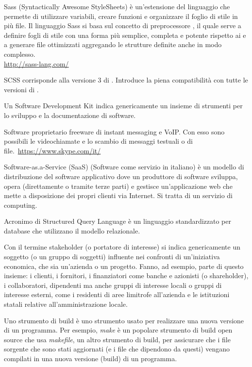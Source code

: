 Sass (Syntactically Awesome StyleSheets) è un'estensione del linguaggio  che permette di utilizzare variabili, creare funzioni e organizzare il foglio di stile in più file. Il linguaggio Sass si basa sul concetto di preprocessore , il quale serve a definire fogli di stile con una forma più semplice, completa e potente rispetto ai  e a generare file  ottimizzati aggregando le strutture definite anche in modo complesso.\\
\url{http://sass-lang.com/}

SCSS corrisponde alla versione 3 di . Introduce la piena compatibilità con tutte le versioni di .

Un Software Development Kit indica genericamente un insieme di strumenti per lo sviluppo e la documentazione di software.

Software proprietario freeware di instant messaging e VoIP. Con esso sono possibili le videochiamate e lo scambio di messaggi testuali o di file.\
\url{https://www.skype.com/it/}

Software-as.a-Service (SaaS) (Software come servizio in italiano) è un modello di distribuzione del software applicativo dove un produttore di software sviluppa, opera (direttamente o tramite terze parti) e gestisce un'applicazione web che mette a disposizione dei propri clienti via Internet. Si tratta di un servizio di  computing.

Acronimo di Structured Query Language \`e un linguaggio standardizzato per database che utilizzano il modello relazionale.

Con il termine stakeholder (o portatore di interesse) si indica genericamente un soggetto (o un gruppo di soggetti) influente nei confronti di un'iniziativa economica, che sia un'azienda o un progetto.
Fanno, ad esempio, parte di questo insieme: i clienti, i fornitori, i finanziatori come banche e azionisti (o shareholder), i collaboratori, dipendenti ma anche gruppi di interesse locali o gruppi di interesse esterni, come i residenti di aree limitrofe all'azienda e le istituzioni statali relative all'amministrazione locale.

Uno strumento di build è uno strumento usato per realizzare una nuova versione di un programma. Per esempio, \textit{make} è un popolare strumento di build open source che usa \textit{makefile}, un altro strumento di build, per assicurare che i file sorgente che sono stati aggiornati (e i file che dipendono da questi) vengano compilati in una nuova versione (build) di un programma.

